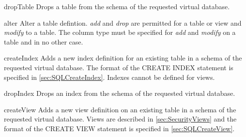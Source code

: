 \begin{method}{dropTable}
\desc Drops a table from the schema of the requested virtual database.
\end{method}

\begin{method}{alter}
\desc Alter a table defintion. \textit{add} and \textit{drop} are permitted
for a table or view and \textit{modify} to a table. The column type must be
specified for \textit{add} and  \textit{modify} on a table and in no other case.
\end{method}

\begin{method}{createIndex}
\desc Adds a new index definition for an existing table in a schema of the requested
virtual database. The format of the CREATE INDEX statement is specified in
\ref{sec:SQLCreateIndex}. Indexes cannot be defined for views. 
\end{method}

\begin{method}{dropIndex}
\desc Drops an index from the schema of the requested virtual database.
\end{method}

\begin{method}{createView}
\desc Adds a new view definition on an existing table in a schema of the requested
virtual database. Views are described in \ref{sec:SecurityViews} and the format
of the CREATE VIEW statement is specified in \ref{sec:SQLCreateView}. 
\end{method}

